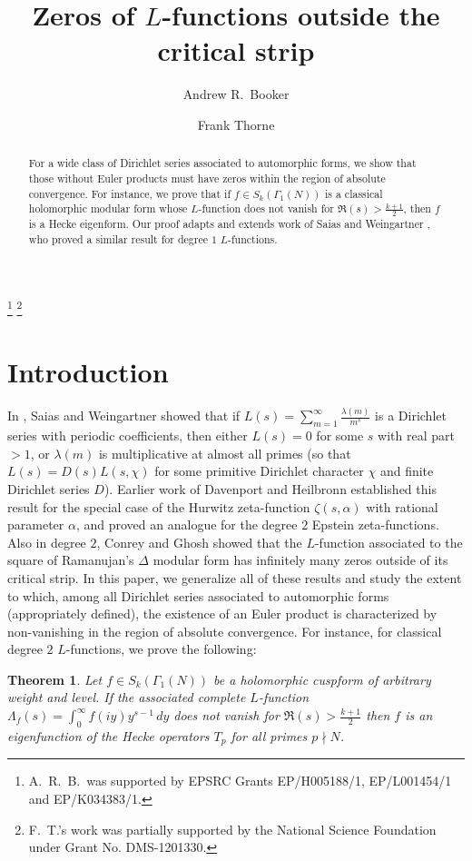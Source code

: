 \documentclass[11pt]{amsart}
\newtheorem{theorem}{Theorem}
\theoremstyle{remark}
\numberwithin{theorem}{section}
\numberwithin{equation}{section}
\begin{document}
\title{Zeros of $L$-functions outside the critical strip}

\author{Andrew R.~Booker}
\address{School of Mathematics, University of Bristol,
University Walk, Bristol, BS8 1TW, United Kingdom}
\thanks{A.~R.~B.\ was supported by EPSRC Grants EP/H005188/1,
EP/L001454/1 and EP/K034383/1.}
\thanks{F.~T.'s work was 
partially supported by the National Science Foundation under Grant No. DMS-1201330.}

\author{Frank Thorne}
\address{Department of Mathematics, University of South Carolina,
1523 Greene Street, Columbia, SC 29208, USA}

\begin{abstract}
For a wide class of Dirichlet series associated to automorphic forms,
we show that those without Euler products must have zeros
within the region of absolute convergence.  For instance, we prove that
if $f\in S_k(\Gamma_1(N))$ is a classical holomorphic modular form whose
$L$-function does not vanish for $\Re(s)>\frac{k+1}2$, then $f$ is a Hecke
eigenform.  Our proof adapts and extends work of Saias and Weingartner
\cite{SW}, who proved a similar result for degree $1$ $L$-functions.
\end{abstract}

\maketitle
\section{Introduction}
In \cite{SW}, Saias and Weingartner showed that if
$L(s)=\sum_{m=1}^\infty\frac{\lambda(m)}{m^s}$ is a Dirichlet series
with periodic coefficients, then either $L(s)=0$ for some $s$ with real
part $>1$, or $\lambda(m)$ is multiplicative at almost all primes (so
that $L(s)=D(s)L(s,\chi)$ for some primitive Dirichlet character $\chi$
and finite Dirichlet series $D$).  Earlier work of Davenport and Heilbronn
\cite{dh1,dh2} established this result for the special case of the Hurwitz
zeta-function $\zeta(s,\alpha)$ with rational parameter $\alpha$, and
proved an analogue for the degree $2$ Epstein zeta-functions. Also in
degree $2$, Conrey and Ghosh \cite{cg} showed that the $L$-function
associated to the square of Ramanujan's $\Delta$ modular form has
infinitely many zeros outside of its critical strip.  In this paper, we
generalize all of these results and study the extent to which, among all
Dirichlet series associated to automorphic forms (appropriately defined),
the existence of an Euler product is characterized by non-vanishing in
the region of absolute convergence.  For instance, for classical degree
$2$ $L$-functions, we prove the following:
\begin{theorem}\label{thm:classical}
Let $f\in S_k(\Gamma_1(N))$ be a holomorphic cuspform of arbitrary
weight and level. If the associated complete $L$-function
$\Lambda_f(s)=\int_0^\infty f(iy)y^{s-1}\,dy$ does not vanish for
$\Re(s)>\frac{k+1}2$ then $f$ is an eigenfunction of the Hecke operators
$T_p$ for all primes $p\nmid N$.
\end{theorem}
\end{document}
